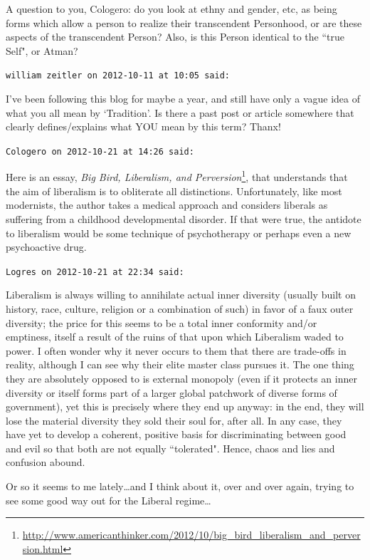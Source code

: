 \begin{footnotesize}
\begin{sffamily}
A question to you, Cologero: do you look at ethny and gender, etc, as being forms which allow a person to realize their
transcendent Personhood, or are these aspects of the transcendent Person? Also, is this Person identical to the ``true
Self", or Atman?


\hfill

\texttt{william zeitler on 2012-10-11 at 10:05 said: }

I've been following this blog for maybe a year, and still have only a vague idea of what you all
mean by `Tradition'. Is there a past post or article somewhere that clearly
defines/explains what YOU mean by this term? Thanx!


\hfill

\texttt{Cologero on 2012-10-21 at 14:26 said: }

Here is an essay, \textit{Big Bird, Liberalism, and Perversion}\footnote{\url{http://www.americanthinker.com/2012/10/big_bird_liberalism_and_perversion.html}}, that understands that the aim of liberalism is to obliterate all
distinctions. Unfortunately, like most modernists, the author takes a medical approach and considers liberals as
suffering from a childhood developmental disorder. If that were true, the antidote to liberalism would be some
technique of psychotherapy or perhaps even a new psychoactive drug.


\hfill

\texttt{Logres on 2012-10-21 at 22:34 said: }

Liberalism is always willing to annihilate actual inner diversity (usually built on history, race, culture, religion or
a combination of such) in favor of a faux outer diversity; the price for this seems to be a total inner conformity
and/or emptiness, itself a result of the ruins of that upon which Liberalism waded to power. I often wonder why it
never occurs to them that there are trade-offs in reality, although I can see why their elite master class pursues it.
The one thing they are absolutely opposed to is external monopoly (even if it protects an inner diversity or itself
forms part of a larger global patchwork of diverse forms of government), yet this is precisely where they end up
anyway: in the end, they will lose the material diversity they sold their soul for, after all. In any case, they have
yet to develop a coherent, positive basis for discriminating between good and evil so that both are not equally
``tolerated". Hence, chaos and lies and confusion abound. 

Or so it seems to me lately…and I think about it, over and over again, trying to see some good way out for the Liberal
regime…


\end{sffamily}\end{footnotesize}
